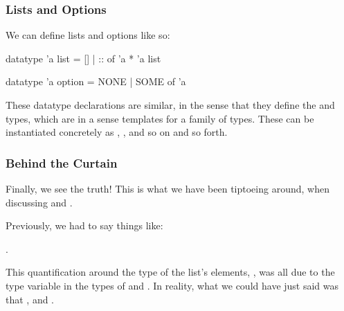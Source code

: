 \documentclass[aspectratio=169]{beamer}
\begin{document}
\begin{frame}[fragile]
  \frametitle{Lists and Options}

  We can define lists and options like so:

  \begin{codeblock}
    datatype 'a list = [] | :: of 'a * 'a list

    datatype 'a option = NONE | SOME of 'a
  \end{codeblock}

  \pause
  \vspace{\fill}

  These datatype declarations are similar, in the sense that they define the
   and  types, which are in a sense templates for
  a family of types. These can be instantiated concretely as ,
  , and so on and so forth.

  \pause
  \vspace{\fill}

\end{frame}

\begin{frame}[fragile]
  \frametitle{Behind the Curtain}

  Finally, we see the truth! This is what we have been tiptoeing around, when
  discussing \code{[]} and \code{::}.

  \pause
  \vspace{\fill}

  Previously, we had to say things like:

  .

  \pause
  \vspace{\fill}

  This quantification around the type of the list's elements, , was all
  due to the type variable in the types of \code{[]} and \code{::}. In reality,
  what we could have just said was that , and
  .

\end{frame}
\end{document}

